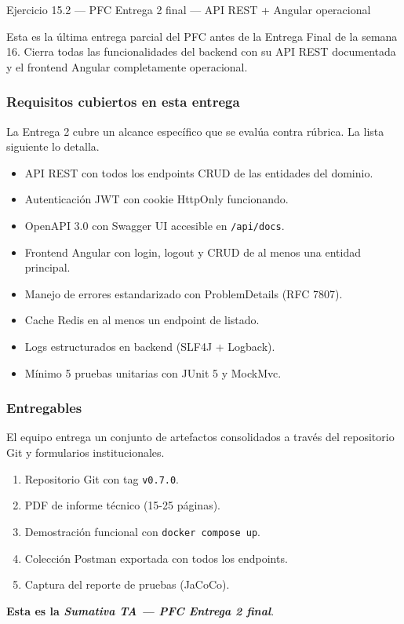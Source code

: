 \begin{cajaejercicio}{Ejercicio 15.2 --- PFC Entrega 2 final --- API REST + Angular operacional}

Esta es la última entrega parcial del PFC antes de la Entrega Final
de la semana 16. Cierra todas las funcionalidades del backend con su
API REST documentada y el frontend Angular completamente operacional.

\subsubsection*{Requisitos cubiertos en esta entrega}

La Entrega 2 cubre un alcance específico que se evalúa
contra rúbrica. La lista siguiente lo detalla.


\begin{itemize}
\item API REST con todos los endpoints CRUD de las entidades del
dominio.
\item Autenticación JWT con cookie HttpOnly funcionando.
\item OpenAPI 3.0 con Swagger UI accesible en \texttt{/api/docs}.
\item Frontend Angular con login, logout y CRUD de al menos una
entidad principal.
\item Manejo de errores estandarizado con ProblemDetails (RFC 7807).
\item Cache Redis en al menos un endpoint de listado.
\item Logs estructurados en backend (SLF4J + Logback).
\item Mínimo 5 pruebas unitarias con JUnit 5 y MockMvc.
\end{itemize}

\subsubsection*{Entregables}

El equipo entrega un conjunto de artefactos consolidados a
través del repositorio Git y formularios institucionales.


\begin{enumerate}
\item Repositorio Git con tag \texttt{v0.7.0}.
\item PDF de informe técnico (15-25 páginas).
\item Demostración funcional con \texttt{docker compose up}.
\item Colección Postman exportada con todos los endpoints.
\item Captura del reporte de pruebas (JaCoCo).
\end{enumerate}

\textbf{Esta es la \emph{Sumativa TA --- PFC Entrega 2 final}}.
\end{cajaejercicio}

